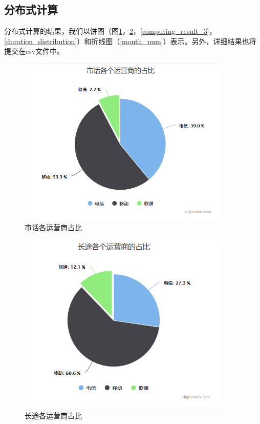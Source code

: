 \documentclass[12pt,a4paper]{article}
\begin{document}
\subsection{分布式计算}
分布式计算的结果，我们以饼图（图\ref{computing_result_1}，\ref{computing_result_2}，\ref{computing_result_3}，\ref{duration_distribution}）和折线图（\ref{month_num}）表示。另外，详细结果也将提交在csv文件中。
\begin{figure}[htb]
\centering
\includegraphics[width=10cm]{computing_result_1}
\caption{市话各运营商占比 \label{computing_result_1}}
\end{figure}
\begin{figure}[htb]
\centering
\includegraphics[width=10cm]{computing_result_2}
\caption{长途各运营商占比 \label{computing_result_2}}
\end{figure}
\end{document}
